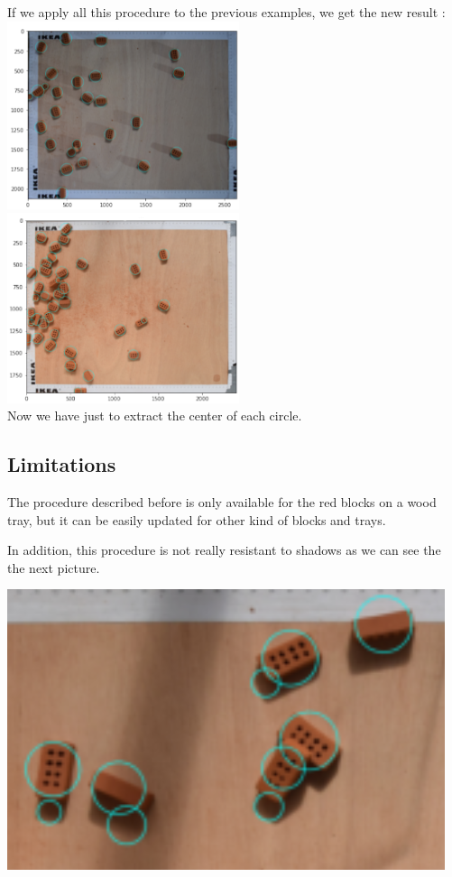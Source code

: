 \documentclass{article}
\begin{document}
If we apply all this procedure to the previous examples, we get the new result : \\
\includegraphics[width=6.8cm]{images/img34.png} 
\includegraphics[width=6.8cm]{images/img35.png}\\

Now we have just to extract the center of each circle.

\subsection{Limitations}

The procedure described before is only available for the red blocks on a wood tray, but it can be easily updated for other kind of blocks and trays.\\


\begin{minipage}{.6\textwidth}%
In addition, this procedure is not really resistant to shadows as we can see the the next picture.
\end{minipage}%
\hfill
\begin{minipage}{.35\textwidth}%
\includegraphics[width=\textwidth]{images/img36.png}
\end{minipage}%
\end{document}
